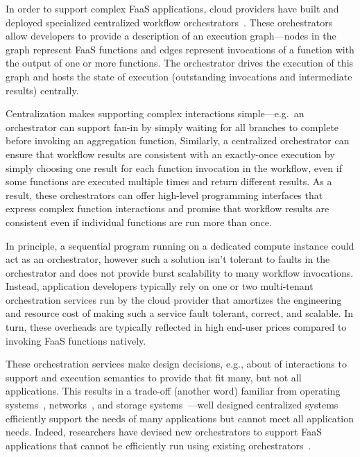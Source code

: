 In order to support complex FaaS applications, cloud providers have built and
deployed specialized centralized workflow
orchestrators~\cite{aws-step-functions, google-cloud-composer, google-workflows,
durable-functions}. These orchestrators allow developers to provide a
description of an execution graph---nodes in the graph represent FaaS functions
and edges represent invocations of a function with the output of one or more
functions. The orchestrator drives the execution of this graph and hosts the
state of execution (outstanding invocations and intermediate results) centrally.

Centralization makes supporting complex interactions simple---e.g.\ an
orchestrator can support fan-in by simply waiting for all branches to complete
before invoking an aggregation function, Similarly, a centralized orchestrator
can ensure that workflow results are consistent with an exactly-once execution
by simply choosing one result for each function invocation in the workflow, even
if some functions are executed multiple times and return different results. As a
result, these orchestrators can offer high-level programming interfaces that
express complex function interactions and promise that workflow results are
consistent even if individual functions are run more than once.

In principle, a sequential program running on a dedicated compute instance could
act as an orchestrator, however such a solution isn't tolerant to faults in the
orchestrator and does not provide burst scalability to many workflow
invocations. Instead, application developers typically rely on one or two
multi-tenant orchestration services run by the cloud provider that amortizes the
engineering and resource cost of making such a service fault tolerant, correct,
and scalable. In turn, these overheads are typically reflected in high end-user
prices compared to invoking FaaS functions natively.

These orchestration services make design decisions, e.g., about of interactions
to support and execution semantics to provide that fit many, but not all
applications. This results in a trade-off (another word) familiar from operating
systems~\cite{exokernel,spin}, networks~\cite{active-networks,sdn}, and storage
systems~\cite{comet,rust-comet}---well designed centralized systems efficiently
support the needs of many applications but cannot meet all application needs.
Indeed, researchers have devised new orchestrators to support FaaS applications
that cannot be efficiently run using existing
orchestrators~\cite{excamera,gg-atc}.

